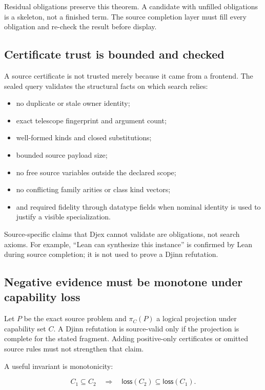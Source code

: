 \documentclass[11pt]{article}
\newcommand{\Djex}{\textsf{Djex}}
\newcommand{\Djinn}{Djinn}
\begin{document}
Residual obligations preserve this theorem.  A candidate with unfilled
obligations is a skeleton, not a finished term.  The source completion layer
must fill every obligation and re-check the result before display.

\subsection{Certificate trust is bounded and checked}

A source certificate is not trusted merely because it came from a frontend.
The sealed query validates the structural facts on which search relies:

\begin{itemize}
  \item no duplicate or stale owner identity;
  \item exact telescope fingerprint and argument count;
  \item well-formed kinds and closed substitutions;
  \item bounded source payload size;
  \item no free source variables outside the declared scope;
  \item no conflicting family arities or class kind vectors;
  \item and required fidelity through datatype fields when nominal identity is
    used to justify a visible specialization.
\end{itemize}

Source-specific claims that \Djex{} cannot validate are obligations, not search
axioms.  For example, ``Lean can synthesize this instance'' is confirmed by
Lean during source completion; it is not used to prove a \Djinn{} refutation.

\subsection{Negative evidence must be monotone under capability loss}

Let \(P\) be the exact source problem and \(\pi_C(P)\) a logical projection
under capability set \(C\).  A \Djinn{} refutation is source-valid only if the
projection is complete for the stated fragment.  Adding positive-only
certificates or omitted source rules must not strengthen that claim.

A useful invariant is monotonicity:

\[
  C_1 \subseteq C_2
  \quad\Longrightarrow\quad
  \mathsf{loss}(C_2) \subseteq \mathsf{loss}(C_1).
\]
\end{document}
